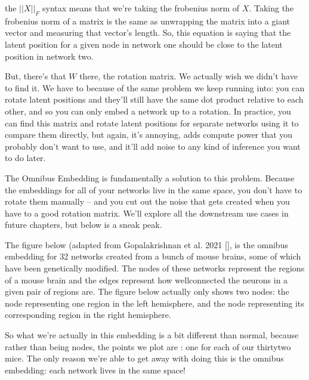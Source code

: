 \documentclass[letterpaper,10pt,english]{jupyterBook}
\begin{document}
\sphinxAtStartPar
the \(||X||_F\) syntax means that we’re taking the frobenius norm of \(X\). Taking the frobenius norm of a matrix is the same as unwrapping the matrix into a giant vector and measuring that vector’s length. So, this equation is saying that the latent position for a given node in network one should be close to the latent position in network two.

\sphinxAtStartPar
But, there’s that \(W\) there, the rotation matrix. We actually wish we didn’t have to find it. We have to because of the same problem we keep running into: you can rotate latent positions and they’ll still have the same dot product relative to each other, and so you can only embed a network up to a rotation. In practice, you can find this matrix and rotate latent positions for separate networks using it to compare them directly, but again, it’s annoying, adds compute power that you probably don’t want to use, and it’ll add noise to any kind of inference you want to do later.

\sphinxAtStartPar
The Omnibus Embedding is fundamentally a solution to this problem. Because the embeddings for all of your networks live in the same space, you don’t have to rotate them manually – and you cut out the noise that gets created when you have to  a good rotation matrix. We’ll explore all the downstream use cases in future chapters, but below is a sneak peak.

\sphinxAtStartPar
The figure below (adapted from Gopalakrishnan et al. 2021 {[}{]},  is the omnibus embedding for 32 networks created from a bunch of mouse brains, some of which have been genetically modified. The nodes of these networks represent the regions of a mouse brain and the edges represent how well\sphinxhyphen{}connected the neurons in a given pair of regions are. The figure below actually only shows two nodes: the node representing one region in the left hemisphere, and the node representing its corresponding region in the right hemisphere.

\sphinxAtStartPar
So what we’re actually  in this embedding is a bit different than normal, because rather than being nodes, the points we plot are : one for each of our thirty\sphinxhyphen{}two mice. The only reason we’re able to get away with doing this is the omnibus embedding: each network lives in the same space!

\noindent{}
\end{document}
